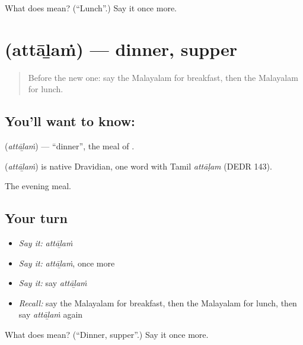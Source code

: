 \begin{tcolorbox}[breakable,colback=teal!4,colframe=teal!35!black,title={Before you move on}]
What does  mean? (\textquotedblleft{}Lunch\textquotedblright{}.) Say it once more.
\end{tcolorbox}
\section[\texorpdfstring{\ml{അത്താഴം} (attāḻaṁ)}{അത്താഴം (attāḻaṁ)}]{ (attāḻaṁ) — dinner, supper}

\label{lesson:ML-C130-dinner}



\begin{quote}
Before the new one: say the Malayalam for breakfast, then the Malayalam for lunch.
\end{quote}

\subsection*{You'll want to know: }
\textbf{} (\emph{attāḻaṁ}) — \textquotedblleft{}dinner\textquotedblright{}, the meal of \textbf{}.

\begin{cousinweb}
\textbf{} (\emph{attāḻaṁ}) is native Dravidian, one word with Tamil \emph{attāḷam} (DEDR 143).
\end{cousinweb}

\begin{grammarlens}[title={What you've built}]
The evening meal.
\end{grammarlens}

\subsection*{Your turn}
\begin{itemize}
\raggedright
  \item \emph{Say it:} \emph{attāḻaṁ}
  \item \emph{Say it:} \emph{attāḻaṁ}, once more
  \item \emph{Say it:} say \emph{attāḻaṁ}
  \item \emph{Recall:} say the Malayalam for breakfast, then the Malayalam for lunch, then say \emph{attāḻaṁ} again
\end{itemize}

\begin{tcolorbox}[breakable,colback=teal!4,colframe=teal!35!black,title={Before you move on}]
What does  mean? (\textquotedblleft{}Dinner, supper\textquotedblright{}.) Say it once more.
\end{tcolorbox}
